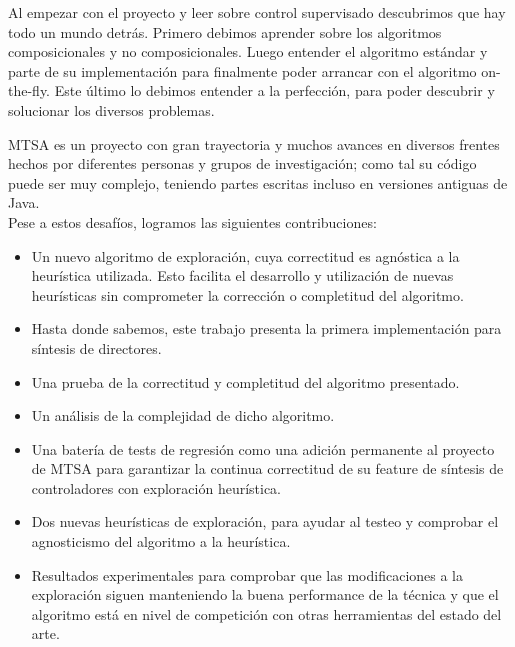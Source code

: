 % 
% 

Al empezar con el proyecto y leer sobre control supervisado descubrimos que hay todo un mundo detrás. Primero debimos aprender sobre los algoritmos composicionales y no composicionales. Luego entender el algoritmo estándar y parte de su implementación para finalmente poder arrancar con el algoritmo on-the-fly. Este último lo debimos entender a la perfección, para poder descubrir y solucionar los diversos problemas. 

MTSA es un proyecto con gran trayectoria y muchos avances en diversos frentes hechos por diferentes personas y grupos de investigación; como tal su código puede ser muy complejo, teniendo partes escritas incluso en versiones antiguas de Java.\\

Pese a estos desafíos, logramos las siguientes contribuciones: 
\begin{itemize}
	
	\item Un nuevo algoritmo de exploración, cuya correctitud es agnóstica a la heurística utilizada. Esto facilita el desarrollo y utilización de nuevas heurísticas sin comprometer la corrección o completitud del algoritmo.
	
	\item Hasta donde sabemos, este trabajo presenta la primera implementación para síntesis de directores.
	
	\item Una prueba de la correctitud y completitud del algoritmo presentado.
	
	\item Un análisis de la complejidad de dicho algoritmo.
	
	\item Una batería de tests de regresión como una adición permanente al proyecto de MTSA para garantizar la continua correctitud de su feature de síntesis de controladores con exploración heurística.
	
	\item Dos nuevas heurísticas de exploración, para ayudar al testeo y comprobar el agnosticismo del algoritmo a la heurística.
	
	\item Resultados experimentales para comprobar que las modificaciones a la exploración siguen manteniendo la buena performance de la técnica y que el algoritmo está en nivel de competición con otras herramientas del estado del arte.
\end{itemize}


